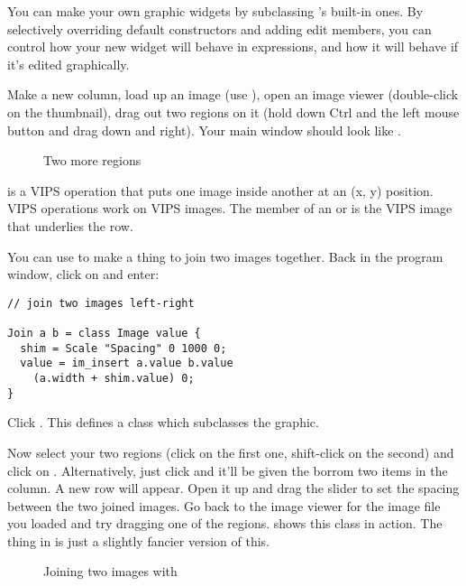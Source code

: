 You can make your own graphic widgets by subclassing \nip{}'s built-in
ones. By selectively overriding default constructors and adding edit members,
you can control how your new widget will behave in expressions, and how it
will behave if it's edited graphically.

Make a new column, load up an image (use ), open an
image viewer (double-click on the thumbnail), drag out two regions on it
(hold down Ctrl and the left mouse button and drag down and right). Your main 
window should look like .

\begin{figure}
\caption{Two more regions}
\end{figure}

 is a VIPS operation that puts one image inside another at an
(x, y) position. VIPS operations work on VIPS images. The  member of
an  or  is the VIPS image that underlies the \nip{} row.

You can use  to make a thing to join two images together. Back
in the program window, click on  and enter:

\begin{verbatim}
// join two images left-right

Join a b = class Image value {
  shim = Scale "Spacing" 0 1000 0;
  value = im_insert a.value b.value
    (a.width + shim.value) 0;
}
\end{verbatim}

\noindent
Click . This defines a class  which
subclasses the  graphic.  

Now select your two regions (click on the first one, shift-click on
the second) and click on . Alternatively,
just click  and it'll be given the borrom two items in the column.
A new  row will appear. Open it up and drag the slider to
set the spacing between the two joined images. Go back to the image
viewer for the image file you loaded and try dragging one of the
regions.  shows this class in action. The thing in
 is just a slightly 
fancier
version of this.

\begin{figure}
\caption{Joining two images with }
\end{figure}


